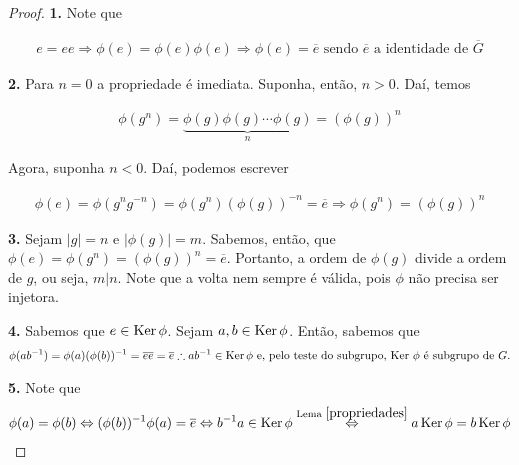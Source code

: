 	\begin{proof}
		\textbf{1.} Note que 
		
		\begin{align*}
		e = ee \Rightarrow \phi(e) = \phi(e)\phi(e) \Rightarrow \phi(e) = \overline{e}\text{ sendo $\overline{e}$ a identidade de $\overline{G}$}
		\end{align*}
		
		\par\vspace{0.3cm}\hspace{17pt}\textbf{2.} Para $n = 0$ a propriedade é imediata. Suponha, então, $n>0$. Daí, temos
		
		\begin{align*}
		\phi(g^n) = \underbrace{\phi(g)\phi(g)\cdots\phi(g)}_{n} = (\phi(g))^n
		\end{align*} 
		
		\par\vspace{0.3cm} Agora, suponha $n<0$. Daí, podemos escrever
		
		\begin{align*}
		\phi(e) = \phi(g^ng^{-n}) = \phi(g^n)(\phi(g))^{-n} = \overline{e} \Rightarrow \phi(g^n) = (\phi(g))^n
		\end{align*}
		
		\par\vspace{0.3cm}\hspace{17pt}\textbf{3.} Sejam $|g| = n$ e $|\phi(g)| = m$. Sabemos, então, que $\phi(e) = \phi(g^n) = (\phi(g))^n = \overline{e}$. Portanto, a ordem de $\phi(g)$ divide a ordem de $g$, ou seja, $m|n$. Note que a volta nem sempre é válida, pois $\phi$ não precisa ser injetora.
		
		\par\vspace{0.3cm}\hspace{17pt}\textbf{4.} Sabemos que $e\in \operatorname{Ker}\phi$. Sejam $a,b\in \operatorname{Ker}\phi$. Então, sabemos que 
		\begin{align*}
		\phi(ab^{-1}) = \phi(a)(\phi(b))^{-1} = \overline{e}\overline{e} = \overline{e} \therefore ab^{-1}\in\operatorname{Ker}\phi\text{ e, pelo teste do subgrupo, Ker $\phi$ é subgrupo de $G$.}
		\end{align*}
		
		\par\vspace{0.3cm}\hspace{17pt}\textbf{5.} Note que 
		\begin{align*}
		\phi(a) = \phi(b) \Leftrightarrow (\phi(b))^{-1}\phi(a) = \overline{e} \Leftrightarrow b^{-1}a\in \operatorname{Ker}\phi \overset{\text{Lema }\eqref{propriedades}}{\Leftrightarrow} a\operatorname{Ker}\phi = b\operatorname{Ker}\phi
		\end{align*}
		

\end{proof}
